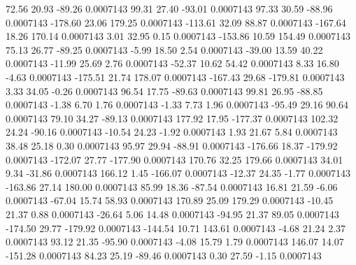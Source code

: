        72.56       20.93      -89.26     0.0007143
       99.31       27.40      -93.01     0.0007143
       97.33       30.59      -88.96     0.0007143
     -178.60       23.06      179.25     0.0007143
     -113.61       32.09       88.87     0.0007143
     -167.64       18.26      170.14     0.0007143
        3.01       32.95        0.15     0.0007143
     -153.86       10.59      154.49     0.0007143
       75.13       26.77      -89.25     0.0007143
       -5.99       18.50        2.54     0.0007143
      -39.00       13.59       40.22     0.0007143
      -11.99       25.69        2.76     0.0007143
      -52.37       10.62       54.42     0.0007143
        8.33       16.80       -4.63     0.0007143
     -175.51       21.74      178.07     0.0007143
     -167.43       29.68     -179.81     0.0007143
        3.33       34.05       -0.26     0.0007143
       96.54       17.75      -89.63     0.0007143
       99.81       26.95      -88.85     0.0007143
       -1.38        6.70        1.76     0.0007143
       -1.33        7.73        1.96     0.0007143
      -95.49       29.16       90.64     0.0007143
       79.10       34.27      -89.13     0.0007143
      177.92       17.95     -177.37     0.0007143
      102.32       24.24      -90.16     0.0007143
      -10.54       24.23       -1.92     0.0007143
        1.93       21.67        5.84     0.0007143
       38.48       25.18        0.30     0.0007143
       95.97       29.94      -88.91     0.0007143
     -176.66       18.37     -179.92     0.0007143
     -172.07       27.77     -177.90     0.0007143
      170.76       32.25      179.66     0.0007143
       34.01        9.34      -31.86     0.0007143
      166.12        1.45     -166.07     0.0007143
      -12.37       24.35       -1.77     0.0007143
     -163.86       27.14      180.00     0.0007143
       85.99       18.36      -87.54     0.0007143
       16.81       21.59       -6.06     0.0007143
      -67.04       15.74       58.93     0.0007143
      170.89       25.09      179.29     0.0007143
      -10.45       21.37        0.88     0.0007143
      -26.64        5.06       14.48     0.0007143
      -94.95       21.37       89.05     0.0007143
     -174.50       29.77     -179.92     0.0007143
     -144.54       10.71      143.61     0.0007143
       -4.68       21.24        2.37     0.0007143
       93.12       21.35      -95.90     0.0007143
       -4.08       15.79        1.79     0.0007143
      146.07       14.07     -151.28     0.0007143
       84.23       25.19      -89.46     0.0007143
        0.30       27.59       -1.15     0.0007143
